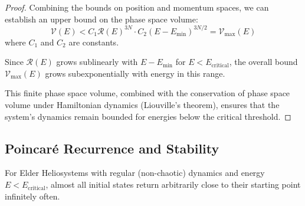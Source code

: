 \begin{proof}
Combining the bounds on position and momentum spaces, we can establish an upper bound on the phase space volume:
\begin{equation}
\mathcal{V}(E) < C_1 \mathcal{R}(E)^{3N} \cdot C_2 (E - E_{\text{min}})^{3N/2} = \mathcal{V}_{\text{max}}(E)
\end{equation}
where $C_1$ and $C_2$ are constants.

Since $\mathcal{R}(E)$ grows sublinearly with $E - E_{\text{min}}$ for $E < E_{\text{critical}}$, the overall bound $\mathcal{V}_{\text{max}}(E)$ grows subexponentially with energy in this range.

This finite phase space volume, combined with the conservation of phase space volume under Hamiltonian dynamics (Liouville's theorem), ensures that the system's dynamics remain bounded for energies below the critical threshold.
\end{proof}

\subsection{Poincaré Recurrence and Stability}

\begin{theorem}
For Elder Heliosystems with regular (non-chaotic) dynamics and energy $E < E_{\text{critical}}$, almost all initial states return arbitrarily close to their starting point infinitely often.
\end{theorem}

